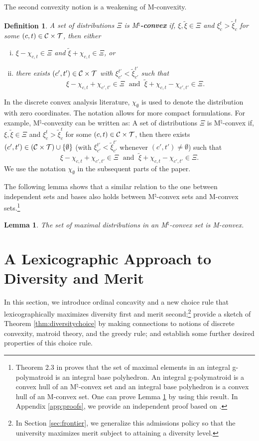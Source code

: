 \documentclass[12pt]{amsart}
\newtheorem{definition}{Definition}
\newtheorem{lemma}{Lemma}
\theoremstyle{remark}
\begin{document}
The second convexity notion is a weakening of M-convexity.

\begin{definition}
A set of distributions $\Xi$ is M$^{\natural}$\textbf{-convex} if, $\xi,\tilde{\xi} \in \Xi$ and $\xi_c^t>\tilde{\xi}_c^t$ for some
$(c,t) \in \mathcal{C} \times \mathcal{T}$, then either
\begin{enumerate}[(i)]
\item $\xi-\chi_{c,t} \in \Xi$ and $\tilde{\xi}+\chi_{c,t} \in \Xi$, or
\item there exists $(c',t') \in \mathcal{C} \times \mathcal{T}$ with  $\xi_{c'}^{t'}<\tilde{\xi}_{c'}^{t'}$ such that
\[\xi-\chi_{c,t}+\chi_{c',t'}\in \Xi \; \mbox{ and } \; \tilde{\xi}+\chi_{c,t}-\chi_{c',t'} \in \Xi.\]
\end{enumerate}
\end{definition}

In the discrete convex analysis literature, $\chi_{\emptyset}$ is used to denote the distribution with zero coordinates. The notation allows for more compact formulations.
For example, M$^{\natural}$-convexity can be written as: A set of distributions $\Xi$ is M$^{\natural}$-convex if, $\xi,\tilde{\xi} \in \Xi$ and
$\xi_c^t>\tilde{\xi}_c^t$ for some $(c,t) \in \mathcal{C} \times \mathcal{T}$, then there exists $(c',t') \in (\mathcal{C} \times \mathcal{T}) \cup \{\emptyset\}$
(with $\xi_{c'}^{t'}<\tilde{\xi}_{c'}^{t'}$ whenever $(c',t')\neq \emptyset$) such that
\[\xi-\chi_{c,t}+\chi_{c',t'}\in \Xi \; \mbox{ and } \; \tilde{\xi}+\chi_{c,t}-\chi_{c',t'} \in \Xi.\]
We use the notation $\chi_{\emptyset}$ in the subsequent parts of the paper.

The following lemma shows that a similar relation to the one between independent sets and bases also holds between M$^{\natural}$-convex sets
and M-convex sets.\footnote{Theorem 2.3 in \cite{fujishige2005submodular} proves that the set of maximal elements in an integral g-polymatroid is an integral base polyhedron.
An integral g-polymatroid is a convex hull of an M$^\natural$-convex set and an integral base polyhedron is a convex hull of an M-convex set. One can prove Lemma \ref{lem:mconvex} by using this result. In Appendix \ref{app:proofs}, we provide an independent proof based on \cite{murotashioura2018}.}


\begin{lemma}\label{lem:mconvex}
The set of maximal distributions in an M$^{\natural}$-convex set is M-convex.
\end{lemma}


\section{A Lexicographic Approach to Diversity and Merit}\label{sec:diversity}
In this section, we introduce ordinal concavity and a new choice rule that lexicographically maximizes
diversity first and merit second;\footnote{In Section \ref{sec:frontier}, we generalize this admissions policy so that the
university maximizes merit subject to attaining a diversity level.}
provide a sketch of Theorem \ref{thm:diversitychoice} by making connections to notions of discrete convexity, matroid theory, and the greedy rule;
and establish some further desired properties of this choice rule.
\end{document}
